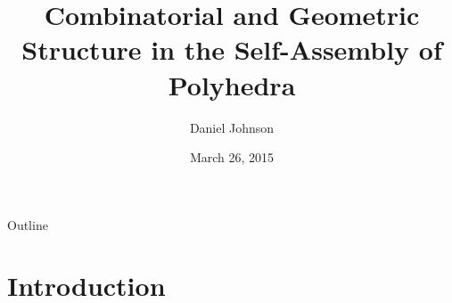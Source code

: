 \documentclass{beamer}
\title{Combinatorial and Geometric Structure in the Self-Assembly of Polyhedra}
\author{Daniel Johnson}
\date{March 26, 2015}
\begin{document}

\frame{\titlepage}

\section[Outline]{}
\begin{frame}{Outline}
  \tableofcontents
\end{frame}
\section{Introduction}
\end{document}
